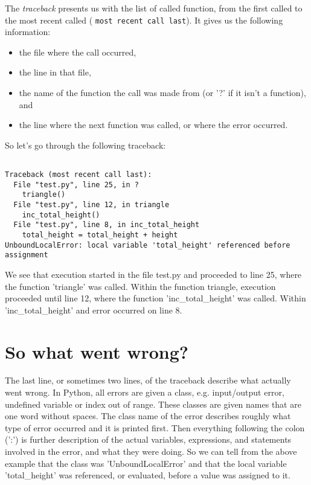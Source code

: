 The \textit{traceback} presents us with the list of called function, from the first called to   the most recent called (
\texttt{most recent call last}). It gives us the following information:                 
\begin{itemize}
	\item the file where the call occurred,
	\item the line in that file,
	\item the name of the function the call was made from (or '?' if it isn't a function), and
	\item the line where the next function was called, or where the error occurred.
\end{itemize}                 So let's go through the following traceback:
\begin{lstlisting}

Traceback (most recent call last):
  File "test.py", line 25, in ?
    triangle()
  File "test.py", line 12, in triangle
    inc_total_height()
  File "test.py", line 8, in inc_total_height
    total_height = total_height + height
UnboundLocalError: local variable 'total_height' referenced before assignment
\end{lstlisting}

We see that execution started in the file test.py and proceeded to   line 25, where the function 'triangle' was called. Within the function   triangle, execution proceeded until line 12, where the function   'inc\_total\_height' was called. Within 'inc\_total\_height' and error   occurred on line 8.

\section{So what went wrong?}

The last line, or sometimes two lines, of the traceback describe   what actually went wrong. In Python, all errors are given a class, e.g.   input/output error, undefined variable or index out of range.   These classes are given names that are one word without spaces.                  The class name of the error describes roughly what type of   error occurred and it is printed first. Then everything following the   colon (':') is further description of the actual variables,   expressions, and statements involved in the error, and what they were   doing. So we can tell from the above example that the class was   'UnboundLocalError' and that the local variable 'total\_height' was   referenced, or evaluated, before a value was assigned to it.

